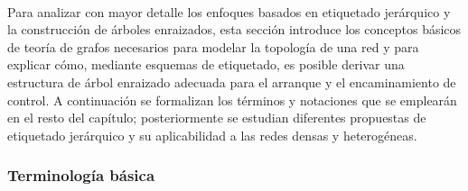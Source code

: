 \\
Para analizar con mayor detalle los enfoques basados en etiquetado jerárquico y la construcción de árboles enraizados, esta sección introduce los conceptos básicos de teoría de grafos necesarios para modelar la topología de una red y para explicar cómo, mediante esquemas de etiquetado, es posible derivar una estructura de árbol enraizado adecuada para el arranque y el encaminamiento de control. A continuación se formalizan los términos y notaciones que se emplearán en el resto del capítulo; posteriormente se estudian diferentes propuestas de etiquetado jerárquico y su aplicabilidad a las redes densas y heterogéneas.  

\subsubsection{Terminología básica}

